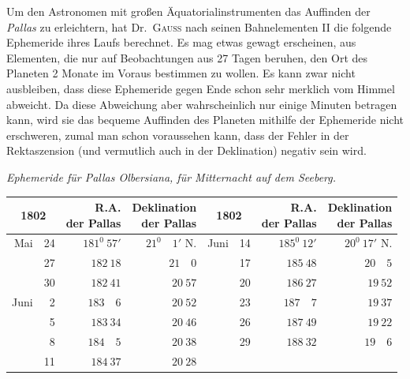 Um den Astronomen mit großen Äquatorialinstrumenten das Auffinden der \textit{Pallas} zu erleichtern, hat Dr.\ \textsc{Gauß} nach seinen Bahnelementen II die folgende Ephemeride ihres Laufs berechnet. Es mag etwas gewagt erscheinen, aus Elementen, die nur auf Beobachtungen aus 27 Tagen beruhen, den Ort des Planeten 2 Monate im Voraus bestimmen zu wollen. Es kann zwar nicht ausbleiben, dass diese Ephemeride gegen Ende schon sehr merklich vom Himmel abweicht. Da diese Abweichung aber wahrscheinlich nur einige Minuten betragen kann, wird sie das bequeme Auffinden des Planeten mithilfe der Ephemeride nicht erschweren, zumal man schon voraussehen kann, dass der Fehler in der Rektaszension (und vermutlich auch in der Deklination) negativ sein wird.
\begin{center}
\textit{Ephemeride für Pallas Olbersiana, für Mitternacht auf dem Seeberg.}\par\medskip
{\small\setlength{\tabcolsep}{5pt}
\begin{tabular}{r r|r|r@{\qquad}r r|r|r}
\multicolumn{2}{c|}{1802}&\shortstack{R.A.\\der Pallas}&\shortstack{Deklination\\der Pallas}&\multicolumn{2}{c|}{1802}&\shortstack{R.A.\\der Pallas}&\shortstack{Deklination\\der Pallas}\\\hline
Mai&24&$181^0\ 57'$&$21^0\quad1'$ N.&Juni&14&$185^0\ 12'$&$20^0\ 17'$ N.\\
&27&$182\ 18$&$21\quad0$&&17&$185\ 48$&$20\quad5$\\
&30&$182\ 41$&$20\ 57$&&20&$186\ 27$&$19\ 52$\\
Juni&2&$183\quad6$&$20\ 52$&&23&$187\quad7$&$19\ 37$\\
&5&$183\ 34$&$20\ 46$&&26&$187\ 49$&$19\ 22$\\
&8&$184\quad5$&$20\ 38$&&29&$188\ 32$&$19\quad6$\\
&11&$184\ 37$&$20\ 28$&&&&
\end{tabular}}
\end{center}
\begin{flushright}\end{flushright}
